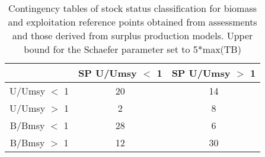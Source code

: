 \begin{table}[ht]
\begin{center}
\begin{tabular}{ccc}
  \hline
 & SP U/Umsy $<$ 1 & SP U/Umsy $>$ 1 \\ 
  \hline
U/Umsy $<$ 1 &  20 &  14 \\ 
  U/Umsy $>$ 1 &   2 &   8 \\ 
  B/Bmsy $<$ 1 &  28 &   6 \\ 
  B/Bmsy $>$ 1 &  12 &  30 \\ 
   \hline
\end{tabular}
\caption{Contingency tables of stock status classification for biomass and exploitation reference points obtained from assessments and those derived from surplus production models. Upper bound for the Schaefer parameter set to 5*max(TB)}
\label{tab:contingency}
\end{center}
\end{table}
